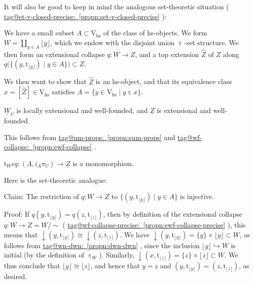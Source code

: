 \documentclass{amsart}
\makeatletter
\newcommand\dwnfn{{\downarrow}}
\newcommand\ein{\mathrel{\varepsilon}}
\newcommand\floor[2][]{#1\lfloor #2 #1\rfloor}
\newcommand\hs{\mathrm{hs}}
\newcommand\hto{\hookrightarrow}
\newcommand\pbig[1]{\big({#1}\big)}
\newcommand\rt{\mathrm{t}}
\newcommand\rV{\mathrm{V}}
\newcommand\set[2][]{#1\{ #2 #1\}}
\newcommand\und[1]{\underline{#1}}
\newcommand\unein{{\ein}}
\newcommand\unsim{{\sim}}
\newcommand\wh[1]{\widehat{#1}}
\newcommand\tagword[1]{\csname tag@#1\endcsname}
\def\label@tag#1:#2\@nil{#1}
\newcommand\labeltag[1]{\label@tag#1:\@nil}
\newcommand\jref[1]{%
  \texorpdfstring%
    {\hyperref[#1]{\tagword{\labeltag{#1}}~\ref*{#1}}}%
    {\tagword{\labeltag{#1}}~\ref*{#1}}%
}
\theoremstyle{definition}
\theoremstyle{remark}
\theoremstyle{plainwithref}
\newenvironment{settybox}{\begin{tcolorbox}[colback=blue!20,breakable%
    ,enhanced%
    ,sharp corners%
    ,frame hidden%
    ,boxsep=0pt
    ,left=5pt,right=5pt,top=5pt,bottom=5pt
    ,enlarge left by=-5pt,width=\linewidth+10pt
    ,enlarge top by=5pt,enlarge bottom by=5pt
    ,before skip balanced=0pt,after skip balanced=0pt
    ]}{\end{tcolorbox}}
\makeatother
\begin{document}
It will also be good to keep in mind the analogous set-theoretic situation (\jref{propn:set-v-closed-precise}):
\begin{settybox}
  We have a small subset \( A \subset \rV_{\hs} \) of the class of hs-objects.
  We form \( W = \coprod_{y \in A} \floor{y} \), which we endow with the disjoint union \( \unein \)-set structure.
  We then form an extensional collapse \( q \colon W \to Z \), and a top extension \( \wh Z \) of \( Z \) along \( q\pbig{ \set{(y, \rt_{\floor y}) \mid y \in A} } \subset Z \).

  We then want to show that \( \wh Z \) is an hs-object, and that its equivalence class \( x = [\wh Z] \in \rV_\hs \) satisfies \( A = \set{y \in \rV_\hs \mid y \ein x} \).
\end{settybox}

\begin{claim}
  \( \und W_U \) is locally extensional and well-founded, and \( \und{Z} \) is extensional and well-founded.
\end{claim}
\noindent
This follows from \jref{propn:sum-props} and \jref{propn:ewf-collapse}.

\begin{claim}
  \( \rt_{W} c q \colon (A, i_A \pi_U) \to \und Z \) is a monomorphism.
\end{claim}
Here is the set-theoretic analogue:
\begin{settybox}
  Claim: The restriction of \( q \colon W \to Z \) to \( \set{(y, \rt_{\floor y}) \mid y \in A} \) is injective.

  Proof:
  If \( q(y, \rt_{\floor y}) = q(z, \rt_{\floor z}) \), then by definition of the extensional collapse \( q \colon W \to Z = W / \unsim \) (\jref{propn:ewf-collapse-precise}), this means that \( \dwnfn(y, \rt_{\floor y}) \cong \dwnfn(z, \rt_{\floor z}) \).
  We have \( \dwnfn(y, \rt_{\floor y}) = \set{y} \times \floor{y} \subset W \), as follows from \jref{propn:dwn-dwn}, since the inclusion \( \floor{y} \hto W \) is initial (by the definition of \( \unein_W \)).
  Similarly, \( \dwnfn(x, \rt_{\floor z}) = \set{z} \times \floor{z} \subset W \).
  We thus conclude that \( \floor{y} \cong \floor{z} \), and hence that \( y = z \) and \( (y, \rt_{\floor y}) = (z, \rt_{\floor z}) \), as desired.
\end{settybox}
\end{document}
